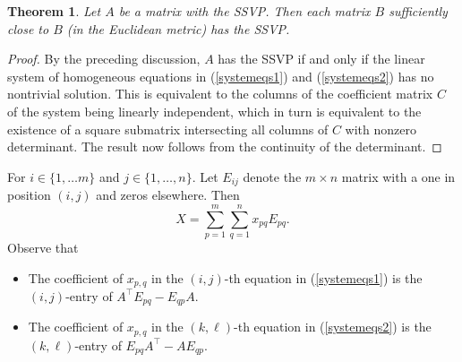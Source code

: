 \documentclass[preprint,12pt]{elsarticle}
\newcommand{\trans  }{^\top}
\newtheorem{theorem}{Theorem}[section]
\begin{document}
\begin{theorem}
\label{open}
Let $A$ be a matrix with the SSVP.
Then each matrix $B$ sufficiently close to $B$ (in the Euclidean metric) has the SSVP. 
\end{theorem} 

\begin{proof}
By the preceding discussion, $A$ has the SSVP if and only if the linear system of homogeneous equations in (\ref{systemeqs1}) and (\ref{systemeqs2}) has no nontrivial solution.  This is equivalent to the columns of the coefficient matrix  $C$ of the system being linearly independent, which in turn is equivalent to the existence of a square submatrix intersecting all columns of  $C$ with nonzero determinant.  The result now follows from the continuity of the determinant. 
\end{proof}

For $i \in \{1,\ldots m\} $ and $j \in \{1,\ldots, n\}$.  Let $E_{ij}$ denote the $m\times n$ matrix with a one in position $(i,j)$ and zeros elsewhere.  Then 
\[ X=\sum_{p=1}^m\sum_{q=1}^n x_{pq}E_{pq}.
\] 
  Observe that 
\begin{itemize}
\label{obs2.8}
\item[\rm (a)]
The coefficient of $x_{p,q}$ in the $(i,j)$-th equation in (\ref{systemeqs1}) 
is the $(i,j)$-entry of $A\trans E_{pq}-E_{qp}A$. 
\item[\rm (b)]  The coefficient of $x_{p,q}$ in the $(k,\ell)$-th equation in (\ref{systemeqs2}) is the 
$(k,\ell)$-entry of $E_{pq}A\trans-A E_{qp}$.
\end{itemize}
 
\end{document}
